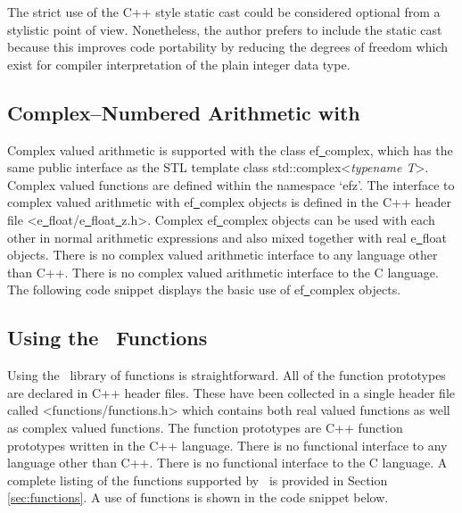 \vspace{4.0pt}

\noindent The strict use of the C++ style static cast could
be considered optional from a stylistic point of view.
Nonetheless, the author prefers to include the static cast
because this improves code portability by reducing
the degrees of freedom which exist for compiler interpretation
of the plain integer data type.


\subsection{Complex--Numbered Arithmetic with \efloathyperref}

Complex valued arithmetic is supported with the class {\courier ef\underline\ complex},
which has the same public interface as the STL template class
{\courier std::complex<{\it typename T}>}.
Complex valued functions are defined within the name\-space `{\courier efz}'.
The interface to complex valued arithmetic with {\courier ef\underline\ complex}
objects is defined in the C++ header file
{\courier <e\underline\ float/e\underline\ float\underline\ z.h>}.
Complex {\ttfamily ef\underline\ complex} objects can be used with each other
in normal arithmetic expressions and also mixed together with real
{\courier e\underline\ float} objects.
There is no complex valued arithmetic interface to any language other than C++.
There is no complex valued arithmetic interface to the C language.
The following code snippet displays the basic
use of {\ttfamily ef\underline\ complex} objects.

\vspace{4.0pt}



\vspace{4.0pt}

\subsection{Using the \efloathyperref\ Functions}

\vspace{3.0pt}

Using the \efloat\ library of functions is straightforward. All of the
function prototypes are declared in C++ header files.
These have been collected in a single header file called
{\courier <func\-tions/\-func\-tions.h>} which contains
both real valued functions as well as complex valued
functions. The function prototypes are C++ function prototypes written in the
C++ language. There is no functional interface to any language other than C++.
There is no functional interface to the C language. A complete listing of the
functions supported by \efloat\ is provided in Section \ref{sec:functions}.
A use of functions is shown in the code snippet below.

